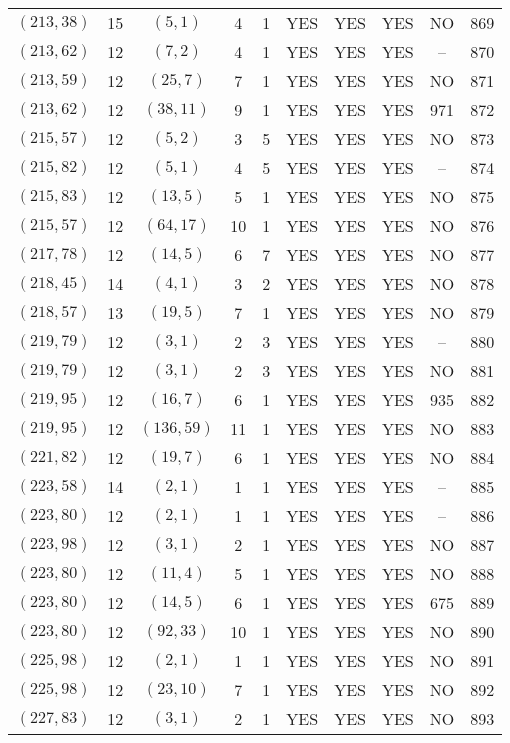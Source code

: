 \begin{longtable}{|c|c|c|c|c|c|c|c|c|c|}
$(213, 38)$ & 15 & $(5, 1)$ & 4 & 1 & YES & YES & YES & NO & 869\\
$(213, 62)$ & 12 & $(7, 2)$ & 4 & 1 & YES & YES & YES & -- & 870\\
$(213, 59)$ & 12 & $(25, 7)$ & 7 & 1 & YES & YES & YES & NO & 871\\
$(213, 62)$ & 12 & $(38, 11)$ & 9 & 1 & YES & YES & YES & 971 & 872\\
$(215, 57)$ & 12 & $(5, 2)$ & 3 & 5 & YES & YES & YES & NO & 873\\
$(215, 82)$ & 12 & $(5, 1)$ & 4 & 5 & YES & YES & YES & -- & 874\\
$(215, 83)$ & 12 & $(13, 5)$ & 5 & 1 & YES & YES & YES & NO & 875\\
$(215, 57)$ & 12 & $(64, 17)$ & 10 & 1 & YES & YES & YES & NO & 876\\
$(217, 78)$ & 12 & $(14, 5)$ & 6 & 7 & YES & YES & YES & NO & 877\\
$(218, 45)$ & 14 & $(4, 1)$ & 3 & 2 & YES & YES & YES & NO & 878\\
$(218, 57)$ & 13 & $(19, 5)$ & 7 & 1 & YES & YES & YES & NO & 879\\
$(219, 79)$ & 12 & $(3, 1)$ & 2 & 3 & YES & YES & YES & -- & 880\\
$(219, 79)$ & 12 & $(3, 1)$ & 2 & 3 & YES & YES & YES & NO & 881\\
$(219, 95)$ & 12 & $(16, 7)$ & 6 & 1 & YES & YES & YES & 935 & 882\\
$(219, 95)$ & 12 & $(136, 59)$ & 11 & 1 & YES & YES & YES & NO & 883\\
$(221, 82)$ & 12 & $(19, 7)$ & 6 & 1 & YES & YES & YES & NO & 884\\
$(223, 58)$ & 14 & $(2, 1)$ & 1 & 1 & YES & YES & YES & -- & 885\\
$(223, 80)$ & 12 & $(2, 1)$ & 1 & 1 & YES & YES & YES & -- & 886\\
$(223, 98)$ & 12 & $(3, 1)$ & 2 & 1 & YES & YES & YES & NO & 887\\
$(223, 80)$ & 12 & $(11, 4)$ & 5 & 1 & YES & YES & YES & NO & 888\\
$(223, 80)$ & 12 & $(14, 5)$ & 6 & 1 & YES & YES & YES & 675 & 889\\
$(223, 80)$ & 12 & $(92, 33)$ & 10 & 1 & YES & YES & YES & NO & 890\\
$(225, 98)$ & 12 & $(2, 1)$ & 1 & 1 & YES & YES & YES & NO & 891\\
$(225, 98)$ & 12 & $(23, 10)$ & 7 & 1 & YES & YES & YES & NO & 892\\
$(227, 83)$ & 12 & $(3, 1)$ & 2 & 1 & YES & YES & YES & NO & 893\\

\end{longtable}
